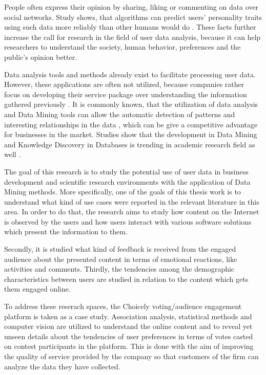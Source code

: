     People often express their opinion by sharing, liking or commenting on data over social networks. Study shows, that algorithms can predict users' personality traits using such data more reliably than other humans would do \cite{youyou2015computer}. These facts further increase the call for research in the field of user data analysis, because it can help researchers to understand the society, human behavior, preferences and the public's opinion better.

    Data analysis tools and methods already exist to facilitate processing user data. However, these applications are often not utilized, because companies rather focus on developing their service package over understanding the information gathered previously \cite{bigdatamanagementrevolution, inmon2007tapping}. It is commonly known, that the utilization of data analysis and Data Mining tools can allow the automatic detection of patterns and interesting relationships in the data \cite{introtodatamining, Friedman97datamining}, which can be give a competitive advantage for businesses in the market. Studies show that the development in Data Mining and Knowledge Discovery in Databases is trending in academic research field as well \cite{bigdatamanagementrevolution, zarsky2002mine}.
    
    The goal of this research is to study the potential use of user data in business development and scientific research environments with the application of Data Mining methods. More specifically, one of the goals of this thesis work is to understand what kind of use cases were reported in the relevant literature in this area. In order to do that, the research aims to study how content on the Internet is observed by the users and how users interact with various software solutions which present the information to them. 
    
    Secondly, it is studied what kind of feedback is received from the engaged audience about the presented content in terms of emotional reactions, like activities and comments. Thirdly, the tendencies among the demographic characteristics between users are studied in relation to the content which gets them engaged online. 
    
    To address these reserach spaces, the Choicely voting/audience engagement platform is taken as a case study. Association analysis, statistical methods and computer vision are utilized to understand the online content and to reveal yet unseen details about the tendencies of user preferences in terms of votes casted on contest participants in the platform. This is done with the aim of improving the quality of service provided by the company so that customers of the firm can analyze the data they have collected.
    
